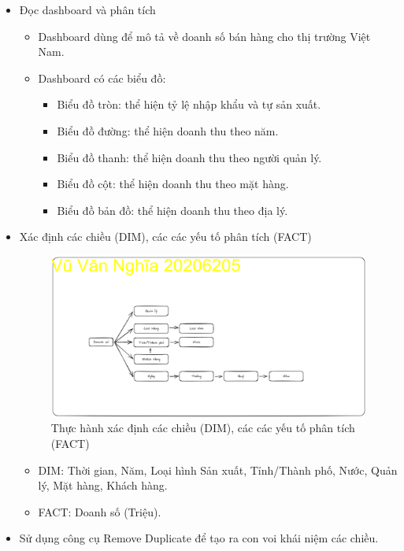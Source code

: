 \documentclass{article}
\begin{document}
\begin{itemize}
\item Đọc dashboard và phân tích
\begin{itemize}
\item Dashboard dùng để mô tả về doanh số bán hàng cho thị trường Việt Nam.
\item Dashboard có các biểu đồ:
\begin{itemize}
\item Biểu đồ tròn: thể hiện tỷ lệ nhập khẩu và tự sản xuất.
\item Biểu đồ đường: thể hiện doanh thu theo năm.
\item Biểu đồ thanh: thể hiện doanh thu theo người quản lý.
\item Biểu đồ cột: thể hiện doanh thu theo mặt hàng.
\item Biểu đồ bản đồ: thể hiện doanh thu theo địa lý.
\end{itemize}
\end{itemize}
\item Xác định các chiều (DIM), các các yếu tố phân tích (FACT)

\begin{figure}[H]
\centering
\includegraphics[scale = 0.15]{Bai1/ThucHanh/DIM-FACT.png}
\caption{Thực hành xác định các chiều (DIM), các các yếu tố phân tích (FACT)}
\end{figure}

\begin{itemize}
\item DIM: Thời gian, Năm, Loại hình Sản xuất, Tỉnh/Thành phố, Nước, Quản lý, Mặt hàng, Khách hàng.
\item FACT: Doanh số (Triệu).
\end{itemize}

\item Sử dụng công cụ Remove Duplicate để tạo ra con voi khái niệm các chiều.


\end{itemize}
\end{document}
